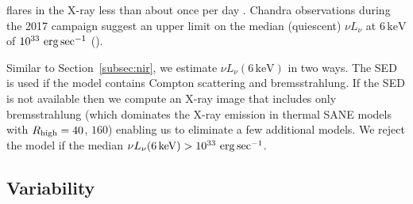 \sgra flares in the X-ray less than about once per day \citep[see, e.g.,][and references therein]{2018MNRAS.473..306Y}.  Chandra observations during the 2017 campaign suggest an upper limit on the median (quiescent) $\nu L_\nu$ at $6\,\mathrm{keV}$ of $10^{33}\,\,\mathrm{erg}\,\mathrm{sec}^{-1}$ ().

Similar to Section~\ref{subsec:nir}, we estimate $\nu L_\nu(6\,\mathrm{keV})$ in two ways.  The SED is used if the model contains Compton scattering and bremsstrahlung.  If the SED is not available then we compute an X-ray image that includes only bremsstrahlung (which dominates the X-ray emission in thermal SANE models with $R_\mathrm{high} = 40$, $160$) enabling us to eliminate a few additional models.  We reject the model if the median $\nu L_\nu(6\,\mathrm{keV}) > 10^{33}\,\,\mathrm{erg}\,\mathrm{sec}^{-1}$.

\subsection{Variability}

%


